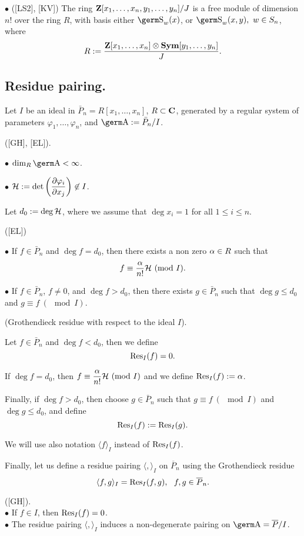 {$\bullet$ ([LS2], [KV]) The ring ${\bf Z}[x_1,\ldots ,x_n,y_1,\ldots ,y_n]/J$ is 
a free module of dimension $n!$ over the ring $R$, with basis either 
$\s_w(x)$, or $\s_w(x,y),\ w\in S_n$, where
$$R:=\frac{{\bf Z}[x_1,\ldots ,x_n]\otimes{\bf Sym}[y_1,\ldots ,y_n]}
{J}.
$$

\subsection{Residue pairing.}

Let $I$ be an ideal in $\bar P_n =R[x_1,\ldots ,x_n]$, $R\subset {\bf C}$, 
generated by a regular system of parameters $\varphi_1,\ldots ,\varphi_n$, 
and $\a :=\bar P_n /I$.

\begin{pr} ([GH], [EL]).

$\bullet$ $\dim_R\a <\infty$.

$\bullet$ ${\cal H}:=\det \left(\displaystyle\frac{\partial\varphi_i}
{\partial x_j}\right)\not\in I$.
\end{pr}

Let $d_0:=\deg\cal H$, where we assume that $\deg x_i=1$ for all 
$1\le i\le n$.

\begin{pr} ([EL])

$\bullet$ If $f\in\bar P_n$ and $\deg f=d_0$, then there exists a non 
zero $\alpha\in R$ such that
$$f\equiv\frac{\al}{n!}{\cal H} \ (\mod I).
$$

$\bullet$ If $f\in\bar P_n$, $f\ne 0$, and $\deg f>d_0$, then there exists 
$g\in\bar P_n$ such that $\deg g\le d_0$ and $g\equiv f \ (\mod I)$.
\end{pr}

\begin{de} (Grothendieck residue with respect to the ideal $I$).

Let $f\in\bar P_n$ and $\deg f<d_0$, then we define
$$\hbox{\rm Res}_I(f)=0.
$$

If $\deg f=d_0$, then $f\equiv \ds\frac{\al}{n!}{\cal H} \ (\mod I)$ and we 
define $\hbox{\rm Res}_I(f):=\alpha$.

Finally, if $\deg f>d_0$, then choose $g\in\bar P_n$ such that $g\equiv 
f \ (\mod I)$ and $\deg g\le d_0$, and define
$$\hbox{\rm Res}_I(f):=\hbox{\rm Res}_I(g).
$$
\end{de}

We will use also notation $\langle f\rangle_I$ instead of $\hbox{\rm Res}_I(f)$.

Finally, let us define a residue pairing $\langle , \rangle_I$ on 
$\overline P_n$ using the Grothendieck residue
$$\langle f,g\rangle_I=\hbox{\rm Res}_I(f,g), \ \ f,g\in\overline P_n.
$$
\begin{pr} ([GH]).\\
$\bullet$ If $f\in I$, then $\hbox{\rm Res}_I(f)=0$.\\
$\bullet$ The residue pairing $\langle , \rangle_I$ induces a 
non-degenerate pairing on $\a =\overline P /I$.
\end{pr}

}
